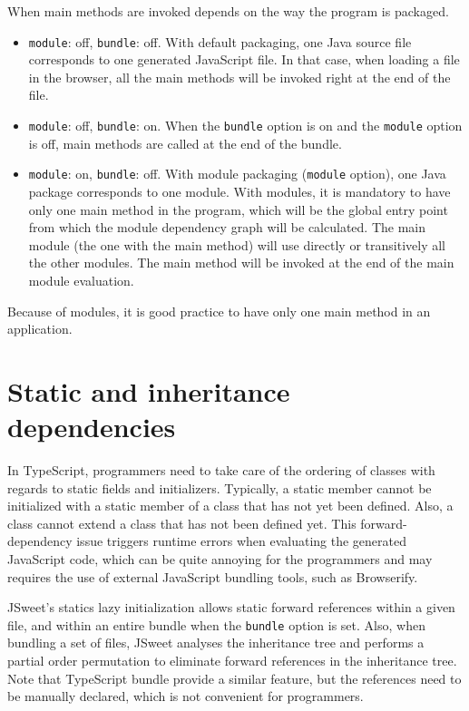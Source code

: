\documentclass[a4paper]{report}
\begin{document}
When main methods are invoked depends on the way the program is packaged. 

\begin{itemize}
\item \texttt{module}: off, \texttt{bundle}: off. With default packaging, one Java source file corresponds to one generated JavaScript file. In that case, when loading a file in the browser, all the main methods will be invoked right at the end of the file. 
\item \texttt{module}: off, \texttt{bundle}: on. When the \texttt{bundle} option is on and the \texttt{module} option is off, main methods are called at the end of the bundle.
\item \texttt{module}: on, \texttt{bundle}: off. With module packaging (\texttt{module} option), one Java package corresponds to one module. With modules, it is mandatory to have only one main method in the program, which will be the global entry point from which the module dependency graph will be calculated. The main module (the one with the main method) will use directly or transitively all the other modules. The main method will be invoked at the end of the main module evaluation.
\end{itemize}

Because of modules, it is good practice to have only one main method in an application.

\section*{Static and inheritance dependencies}

In TypeScript, programmers need to take care of the ordering of classes with regards to static fields and initializers. Typically, a static member cannot be initialized with a static member of a class that has not yet been defined. Also, a class cannot extend a class that has not been defined yet. This forward-dependency issue triggers runtime errors when evaluating the generated JavaScript code, which can be quite annoying for the programmers and may requires the use of external JavaScript bundling tools, such as Browserify.

JSweet's statics lazy initialization allows static forward references within a given file, and within an entire bundle when the \texttt{bundle} option is set. Also, when bundling a set of files, JSweet analyses the inheritance tree and performs a partial order permutation to eliminate forward references in the inheritance tree. Note that TypeScript bundle provide a similar feature, but the references need to be manually declared, which is not convenient for programmers.
\end{document}
